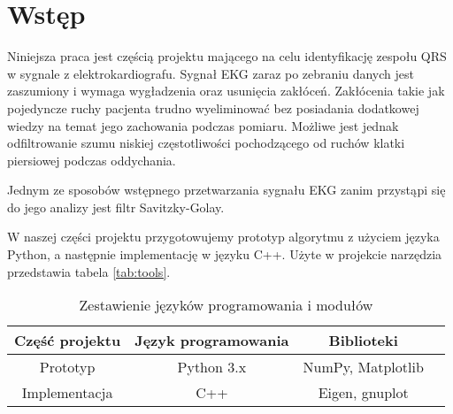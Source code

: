 \section{Wstęp}

Niniejsza praca jest częścią projektu mającego na celu identyfikację zespołu QRS w sygnale z elektrokardiografu. Sygnał EKG zaraz po zebraniu danych jest zaszumiony i wymaga wygładzenia oraz usunięcia zakłóceń. Zakłócenia takie jak pojedyncze ruchy pacjenta trudno wyeliminować bez posiadania dodatkowej wiedzy na temat jego zachowania podczas pomiaru. Możliwe jest jednak odfiltrowanie szumu niskiej częstotliwości pochodzącego od ruchów klatki piersiowej podczas oddychania.

Jednym ze sposobów wstępnego przetwarzania sygnału EKG zanim przystąpi się do jego analizy jest filtr Savitzky-Golay.

W naszej części projektu przygotowujemy prototyp algorytmu z użyciem języka Python, a następnie implementację w języku C++. Użyte w projekcie narzędzia przedstawia tabela \ref{tab:tools}.

\begin{table}[!htb]
  \centering
  \begin{tabular}{|c|c|c|c|}
  \hline
  Część projektu & Język programowania & Biblioteki \\
  \hline
  Prototyp & Python 3.x & NumPy, Matplotlib \\
  \hline
  Implementacja & C++ & Eigen, gnuplot \\
  \hline
  \end{tabular}
  \caption{Zestawienie języków programowania i modułów}
  \label{tab:tabela1}
\end{table}
